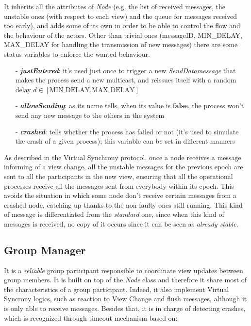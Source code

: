 \documentclass[11pt]{article}
\begin{document}
	It inherits all the attributes of \textit{Node} (e.g. the list of received messages, the unstable ones (with respect to each view) and the queue for messages received too early), and adds some of its own in order to be able to control the flow and the behaviour of the actors. Other than trivial ones (messageID, MIN\_DELAY, MAX\_DELAY for handling the transmission of new messages) there are some status variables to enforce the wanted behaviour. 
	\begin{itemize}
		\item [-] \textit{\textbf{justEntered}}: it's used just once to trigger a new \textit{SendDatamessage} that makes the process send a new multicast, and reissues itself with a random delay $d \in [\text{MIN\_DELAY,MAX\_DELAY}]$
		\item [-] \textit{\textbf{allowSending}}: as its name tells, when its value is \textbf{false}, the process won't send any new message to the others in the system
		\item [-] \textit{\textbf{crashed}}: tells whether the process has failed or not (it's used to simulate the crash of a given process); this variable can be set in different manners 
	\end{itemize}
	As described in the Virtual Synchrony protocol, once a node receives a message informing of a view change, all the unstable messages for the previous epoch are sent to all the participants in the new view, ensuring that all the operational processes receive all the messages sent from everybody within its epoch. This avoids the situation in which some node don't receive certain messages from a crashed node, catching up thanks to the non-faulty ones still running.
	This kind of message is differentiated from the \textit{standard} one, since when this kind of messages is received, no copy of it occurs since it can be seen as \textit{already stable}.
	
	\subsection{Group Manager}
	It is a \textit{reliable} group participant responsible to coordinate view updates between group members. It is built on top of the \textit{Node} class and therefore it share most of the characteristics of a group participant. Indeed, it also implement Virtual Syncrony logics, such as reaction to View Change and flush messages, although it is only able to receive messages. Besides that, it is in charge of detecting crashes, which is recognized through timeout mechanism based on:
	
\end{document}
